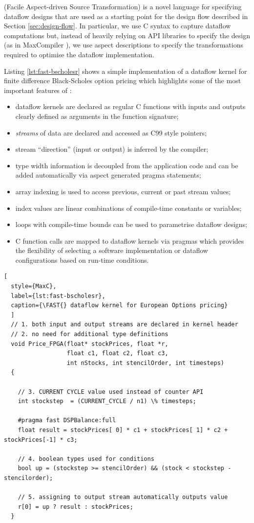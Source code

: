 \label{sec:fast}

\FAST{} (Facile Aspect-driven Source Transformation) is a novel
language for specifying dataflow designs that are used as a starting
point for the design flow described in Section
\ref{sec:design-flow}. In particular, we use C syntax to capture
dataflow computations but, instead of heavily relying on API libraries
to specify the design (as in MaxCompiler \cite{5719584}), we use
aspect descriptions to specify the transformations required to
optimise the dataflow implementation.

Listing \ref{lst:fast-bscholesr} shows a simple implementation of a
dataflow kernel for finite difference Black-Scholes option pricing
which highlights some of the most important features of \FAST{}:
\begin{itemize}
\item dataflow kernels are declared as regular C functions with inputs
  and outputs clearly defined as arguments in the function signature;
\item \emph{streams} of data are declared and accessed as C99 style pointers;
\item stream ``direction'' (input or output) is inferred by the compiler;
\item type width information is decoupled from the application code
  and can be added automatically via aspect generated pragma
  statements;
\item array indexing is used to access previous, current or past
  stream values;
\item index values are linear combinations of compile-time constants
  or variables;
\item loops with compile-time bounds can be used to parametrise
  dataflow designs;
\item C function calls are mapped to dataflow kernels via pragmas
  which provides the flexibility of selecting a software
  implementation or dataflow configurations based on run-time
  conditions.
\end{itemize}

\begin{lstlisting}[
  style={MaxC},
  label={lst:fast-bscholesr},
  caption={\FAST{} dataflow kernel for European Options pricing}
  ]
  // 1. both input and output streams are declared in kernel header
  // 2. no need for additional type definitions
  void Price_FPGA(float* stockPrices, float *r,
                  float c1, float c2, float c3,
                  int nStocks, int stencilOrder, int timesteps)
  {

    // 3. CURRENT CYCLE value used instead of counter API
    int stockstep  = (CURRENT_CYCLE / n1) \% timesteps;

    #pragma fast DSPBalance:full
    float result = stockPrices[ 0] * c1 + stockPrices[ 1] * c2 + stockPrices[-1] * c3;

    // 4. boolean types used for conditions
    bool up = (stockstep >= stencilOrder) && (stock < stockstep - stencilorder);

    // 5. assigning to output stream automatically outputs value
    r[0] = up ? result : stockPrices;
  }

\end{lstlisting}

